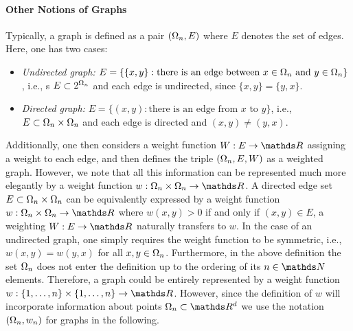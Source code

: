 \paragraph{Other Notions of Graphs}
Typically, a graph is defined as a pair $(\Omega_n,E)$ where $E$ denotes the set of edges. Here, 
one has two cases:
\begin{itemize}
\item \emph{Undirected graph:} $E=\{ \{x,y\}: \text{there is an edge between } x\in \Omega_n \text{ and } y\in \Omega_n\}$, i.e., s
$E\subset 2^{\Omega_n}$ and each edge is undirected, since $\{x,y\}=\{y,x\}$.
%
\item \emph{Directed graph:} $E=\{ (x,y): \text{there is an edge from } x \text{ to } y\}$, i.e.,
$E\subset \Omega_n\times \Omega_n$ and each edge is directed and $(x,y)\neq(y,x)$.
%
\end{itemize}
Additionally, one then considers a weight function $W:E\to\R$ assigning a weight to each edge, and then defines 
the triple $(\Omega_n,E,W)$ as a weighted graph. However, we note that all this information can be represented much more elegantly by a weight function $w:\domain_n\times \domain_n\to\R$. A directed edge set $E\subset \Omega_n\times \Omega_n$ can be equivalently expressed by 
a weight function $w:\domain_n\times \domain_n\to\R$ where $w(x,y)>0$ if and only if $(x,y)\in E$, a weighting $W:E\to\R$ 
naturally transfers to $w$. In the case of an undirected graph, one simply requires the weight function to be symmetric, i.e., 
$w(x,y)=w(y,x)$ for all $x,y\in \Omega_n$.
%
Furthermore, in the above definition the set $\Omega_n$ does not enter the definition up to the  ordering of its $n\in \N$  elements. Therefore, a graph could be entirely represented by a weight function $w:\{1,\ldots,n\}\times\{1,\ldots,n\}\to\R$. However, since the definition of $w$ will incorporate information about points $\domain_n\subset\R^d$ we use the notation $(\Omega_n, w_n)$ for graphs in the following.
%
%
%
